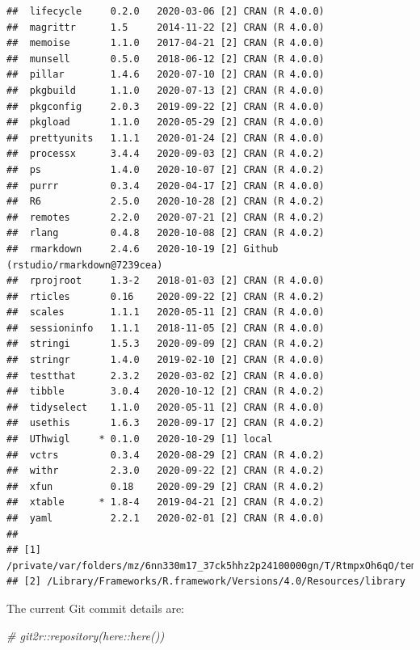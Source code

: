 \documentclass[]{elsarticle} %
\newenvironment{Shaded}{\begin{snugshade}}{\end{snugshade}}
\newcommand{\CommentTok}[1]{\textcolor[rgb]{0.56,0.35,0.01}{\textit{#1}}}
\begin{document}
\begin{verbatim}
##  lifecycle     0.2.0   2020-03-06 [2] CRAN (R 4.0.0)                    
##  magrittr      1.5     2014-11-22 [2] CRAN (R 4.0.0)                    
##  memoise       1.1.0   2017-04-21 [2] CRAN (R 4.0.0)                    
##  munsell       0.5.0   2018-06-12 [2] CRAN (R 4.0.0)                    
##  pillar        1.4.6   2020-07-10 [2] CRAN (R 4.0.0)                    
##  pkgbuild      1.1.0   2020-07-13 [2] CRAN (R 4.0.0)                    
##  pkgconfig     2.0.3   2019-09-22 [2] CRAN (R 4.0.0)                    
##  pkgload       1.1.0   2020-05-29 [2] CRAN (R 4.0.0)                    
##  prettyunits   1.1.1   2020-01-24 [2] CRAN (R 4.0.0)                    
##  processx      3.4.4   2020-09-03 [2] CRAN (R 4.0.2)                    
##  ps            1.4.0   2020-10-07 [2] CRAN (R 4.0.2)                    
##  purrr         0.3.4   2020-04-17 [2] CRAN (R 4.0.0)                    
##  R6            2.5.0   2020-10-28 [2] CRAN (R 4.0.2)                    
##  remotes       2.2.0   2020-07-21 [2] CRAN (R 4.0.2)                    
##  rlang         0.4.8   2020-10-08 [2] CRAN (R 4.0.2)                    
##  rmarkdown     2.4.6   2020-10-19 [2] Github (rstudio/rmarkdown@7239cea)
##  rprojroot     1.3-2   2018-01-03 [2] CRAN (R 4.0.0)                    
##  rticles       0.16    2020-09-22 [2] CRAN (R 4.0.2)                    
##  scales        1.1.1   2020-05-11 [2] CRAN (R 4.0.0)                    
##  sessioninfo   1.1.1   2018-11-05 [2] CRAN (R 4.0.0)                    
##  stringi       1.5.3   2020-09-09 [2] CRAN (R 4.0.2)                    
##  stringr       1.4.0   2019-02-10 [2] CRAN (R 4.0.0)                    
##  testthat      2.3.2   2020-03-02 [2] CRAN (R 4.0.0)                    
##  tibble        3.0.4   2020-10-12 [2] CRAN (R 4.0.2)                    
##  tidyselect    1.1.0   2020-05-11 [2] CRAN (R 4.0.0)                    
##  usethis       1.6.3   2020-09-17 [2] CRAN (R 4.0.2)                    
##  UThwigl     * 0.1.0   2020-10-29 [1] local                             
##  vctrs         0.3.4   2020-08-29 [2] CRAN (R 4.0.2)                    
##  withr         2.3.0   2020-09-22 [2] CRAN (R 4.0.2)                    
##  xfun          0.18    2020-09-29 [2] CRAN (R 4.0.2)                    
##  xtable      * 1.8-4   2019-04-21 [2] CRAN (R 4.0.2)                    
##  yaml          2.2.1   2020-02-01 [2] CRAN (R 4.0.0)                    
## 
## [1] /private/var/folders/mz/6nn330m17_37ck5hhz2p24100000gn/T/RtmpxOh6qO/temp_libpathfd171541be75
## [2] /Library/Frameworks/R.framework/Versions/4.0/Resources/library
\end{verbatim}

The current Git commit details are:

\begin{Shaded}
\begin{Highlighting}[]
\CommentTok{\# git2r::repository(here::here())}
\end{Highlighting}
\end{Shaded}
\end{document}
